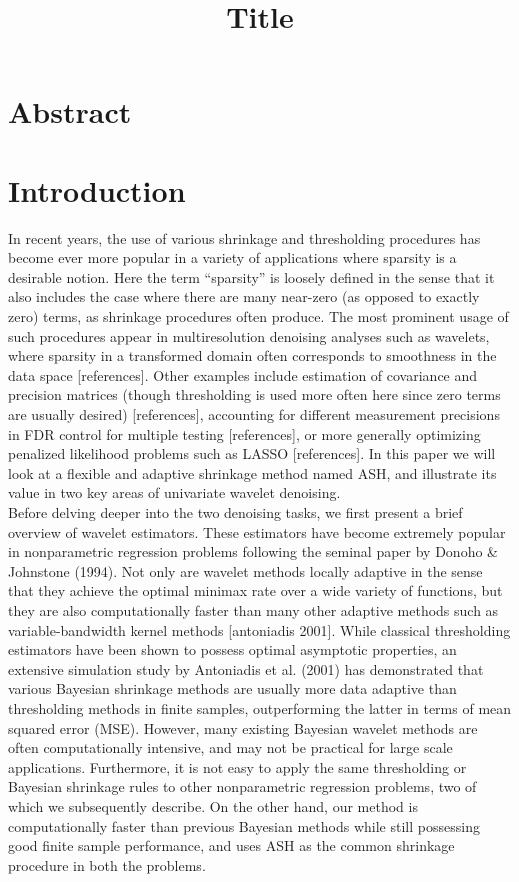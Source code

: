 \documentclass[12pt]{article}
\begin{document}
\title{\textbf{Title}}
\date{}
\maketitle

\section{Abstract}
\section{Introduction}
In recent years, the use of various shrinkage and thresholding procedures has become ever more popular in a variety of applications where sparsity is a desirable notion. Here the term ``sparsity'' is loosely defined in the sense that it also includes the case where there are many near-zero (as opposed to exactly zero) terms, as shrinkage procedures often produce. The most prominent usage of such procedures appear in multiresolution denoising analyses such as wavelets, where sparsity in a transformed domain often corresponds to smoothness in the data space [references]. Other examples include estimation of covariance and precision matrices (though thresholding is used more often here since zero terms are usually desired) [references], accounting for different measurement precisions in FDR control for multiple testing [references], or more generally optimizing penalized likelihood problems such as LASSO [references]. In this paper we will look at a flexible and adaptive shrinkage method named ASH, and illustrate its value in two key areas of univariate wavelet denoising.\bigskip\\
Before delving deeper into the two denoising tasks, we first present a brief overview of wavelet estimators. These estimators have become extremely popular in nonparametric regression problems following the seminal paper by Donoho \& Johnstone (1994). Not only are wavelet methods locally adaptive in the sense that they achieve the optimal minimax rate over a wide variety of functions, but they are also computationally faster than many other adaptive methods such as variable-bandwidth kernel methods [antoniadis 2001]. While classical thresholding estimators have been shown to possess optimal asymptotic properties, an extensive simulation study by Antoniadis et al. (2001) has demonstrated that various Bayesian shrinkage methods are usually more data adaptive than thresholding methods in finite samples, outperforming the latter in terms of mean squared error (MSE). However, many existing Bayesian wavelet methods are often computationally intensive, and may not be practical for large scale applications. Furthermore, it is not easy to apply the same thresholding or Bayesian shrinkage rules to other nonparametric regression problems, two of which we subsequently describe. On the other hand, our method is computationally faster than previous Bayesian methods while still possessing good finite sample performance, and uses ASH as the common shrinkage procedure in both the problems.\bigskip\\
\end{document}
